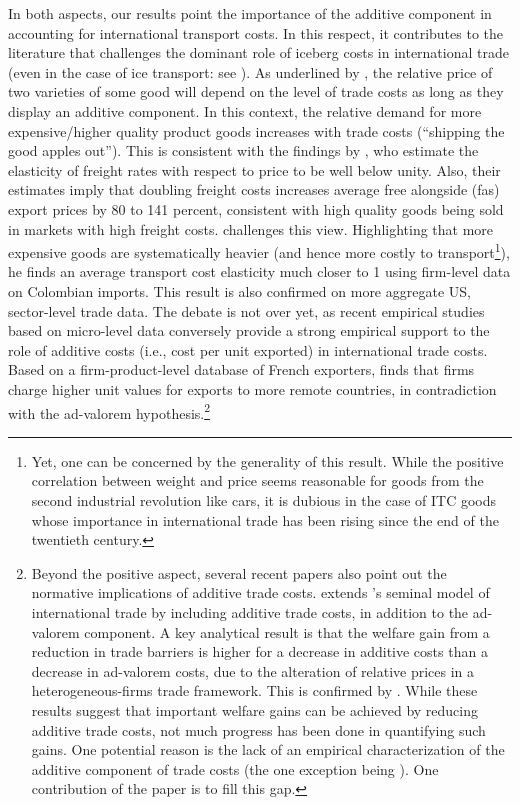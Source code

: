 \documentclass[a4paper,11pt]{article}
\begin{document}
In both aspects, our results point the importance of the additive component in accounting for international transport costs. In this respect, it contributes to the literature that challenges the dominant role of iceberg costs in international trade (even in the case of ice transport: see \citealp{bosker2018ice}). As underlined by \cite{alchian}, the relative price of two varieties of some good will depend on the level of trade costs as long as they display an additive component. In this context, the relative demand for more expensive/higher quality product goods increases with trade costs (``shipping the good apples out''). This is consistent with the findings by \citet{hummels_skiba}, who estimate the elasticity of freight rates with respect to price to be well below unity. Also, their estimates imply that doubling freight costs increases average free alongside (fas) export prices by 80 to 141 percent, consistent with high quality goods being sold in markets with high freight costs. \citet{Lashkaripour-mimeo-2017} challenges this view. Highlighting that more expensive goods are systematically heavier (and hence more costly to transport\footnote{Yet, one can be concerned by the generality of this result. While the positive correlation between weight and price seems reasonable for goods from the second industrial revolution like cars, it is dubious in the case of ITC goods whose importance in international trade has been rising since the end of the twentieth century.}), he finds an average transport cost elasticity much closer to 1 using firm-level data on Colombian imports. This result is also confirmed on more aggregate US, sector-level trade data. The debate is not over yet, as recent empirical studies based on micro-level data conversely provide a strong empirical support to the role of additive costs (i.e., cost per unit exported) in international trade costs. Based on a firm-product-level database of French exporters, \citet{martin2012} finds that firms charge higher unit values for exports to more remote countries, in contradiction with the ad-valorem hypothesis.\footnote{Beyond the positive aspect, several recent papers also point out the normative implications of additive trade costs. \citet{sorensen2014} extends \citet{melitz}'s seminal model of international trade by including additive trade costs, in addition to the ad-valorem component. A key analytical result is that the welfare gain from a reduction in trade barriers is higher for a decrease in additive costs than a decrease in ad-valorem costs, due to the alteration of relative prices in a heterogeneous-firms trade framework. This is confirmed by \cite{Irrazabal_2015}. While these results suggest that important welfare gains can be achieved by reducing additive trade costs, not much progress has been done in quantifying such gains. One potential reason is the lack of an empirical characterization of the additive component of trade costs (the one exception being \citet{Irrazabal_2015}). One contribution of the paper is to fill this gap.}
\end{document}
